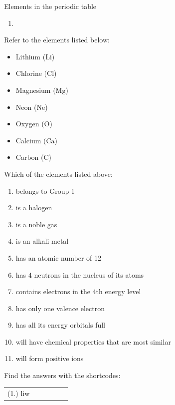 \begin{exercises}{Elements in the periodic table}
            \nopagebreak
\begin{enumerate}[noitemsep, label=\textbf{\arabic*}. ]
 \item 
\end{enumerate}

            \label{m38760*id262476}Refer to the elements listed below: \label{m38760*id7632}\begin{itemize}[noitemsep]
            \item Lithium ($\mathrm{Li}$)\item Chlorine ($\mathrm{Cl}$)\item Magnesium ($\mathrm{Mg}$)\item Neon ($\mathrm{Ne}$)\item Oxygen ($\mathrm{O}$)\item Calcium ($\mathrm{Ca}$)\item Carbon ($\mathrm{C}$)\end{itemize}
         Which of the elements listed above:
        \label{m38760*id262499}\begin{enumerate}[noitemsep, label=\textbf{\arabic*}. ] 
            \label{m38760*uid158}\item belongs to Group 1
\label{m38760*uid159}\item is a halogen
\label{m38760*uid160}\item is a noble gas
\label{m38760*uid161}\item is an alkali metal
\label{m38760*uid162}\item has an atomic number of 12
\label{m38760*uid163}\item has 4 neutrons in the nucleus of its atoms
\label{m38760*uid164}\item contains electrons in the 4th energy level
\label{m38760*uid165}\item has only one valence electron
\label{m38760*uid166}\item has all its energy orbitals full
\label{m38760*uid167}\item will have chemical properties that are most similar
\label{m38760*uid168}\item will form positive ions
\end{enumerate}
         \par 
\label{m38760**end}
\par {} Find the answers with the shortcodes:
 \par \begin{tabular}[h]{cccccc}
 (1.) liw  & \end{tabular}

\end{exercises}


